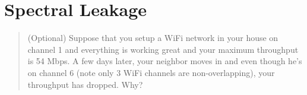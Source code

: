 \documentclass[11pt]{article}
\begin{document}
\section{Spectral Leakage}
\begin{quote}
	(Optional) Suppose that you setup a WiFi network in your house on channel 1 and everything is working great and your maximum throughput is 54 Mbps. A few days later, your neighbor moves in and even though he's on channel 6 (note only 3 WiFi channels are non-overlapping), your throughput has dropped. Why?
\end{quote}
\end{document}
